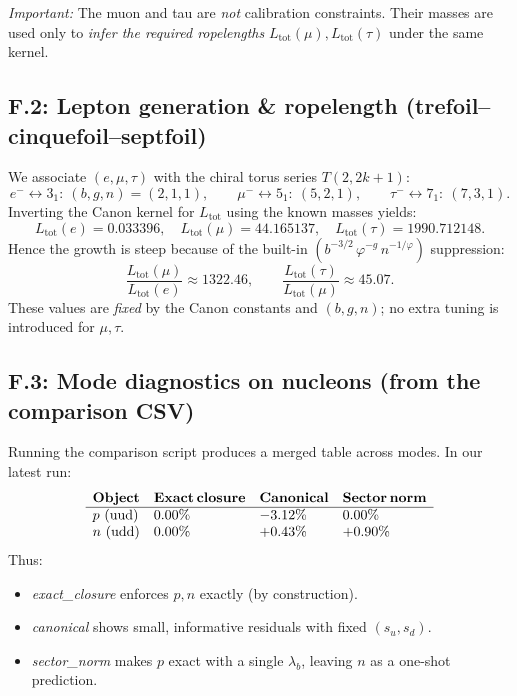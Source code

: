 \documentclass[smallextended]{svjour3}       %
\begin{document}
		\emph{Important:} The muon and tau are \emph{not} calibration constraints. Their masses are used only to \emph{infer the required ropelengths} \(L_{\text{tot}}(\mu),L_{\text{tot}}(\tau)\) under the same kernel.

		\subsection*{F.2: Lepton generation \& ropelength (trefoil–cinquefoil–septfoil)}
		We associate \((e,\mu,\tau)\) with the chiral torus series $T(2,2k{+}1)$:
		\[
		e^- \leftrightarrow 3_1:\ (b,g,n)=(2,1,1),\qquad
		\mu^- \leftrightarrow 5_1:\ (5,2,1),\qquad
		\tau^- \leftrightarrow 7_1:\ (7,3,1).
		\]
		Inverting the Canon kernel for \(L_{\text{tot}}\) using the known masses yields:\footnotesize
		\[
		L_{\text{tot}}(e)=0.033396,\quad
		L_{\text{tot}}(\mu)=44.165137,\quad
		L_{\text{tot}}(\tau)=1990.712148.
		\]
		\normalsize
		Hence the growth is steep because of the built-in \((b^{-3/2}\,\varphi^{-g}\,n^{-1/\varphi})\) suppression:
		\[
		\frac{L_{\text{tot}}(\mu)}{L_{\text{tot}}(e)}\approx 1322.46,\qquad
		\frac{L_{\text{tot}}(\tau)}{L_{\text{tot}}(\mu)}\approx 45.07.
		\]
		These values are \emph{fixed} by the Canon constants and \((b,g,n)\); no extra tuning is introduced for \(\mu,\tau\).

		\subsection*{F.3: Mode diagnostics on nucleons (from the comparison CSV)}
		Running the comparison script produces a merged table across modes. In our latest run:
		\[
		\begin{array}{llll}
		\textbf{Object} & \textbf{Exact\,closure} & \textbf{Canonical} & \textbf{Sector\,norm} \\
		\hline
		p\ (\text{uud}) & 0.00\% & {-}3.12\% & 0.00\% \\
		n\ (\text{udd}) & 0.00\% & {+}0.43\% & {+}0.90\% \\
		\end{array}
		\]
		Thus:
		\begin{itemize}
		\item \textit{exact\_closure} enforces \(p,n\) exactly (by construction).
		\item \textit{canonical} shows small, informative residuals with fixed \((s_u,s_d)\).
		\item \textit{sector\_norm} makes \(p\) exact with a single \(\lambda_b\), leaving \(n\) as a one-shot prediction.
		\end{itemize}
\end{document}

